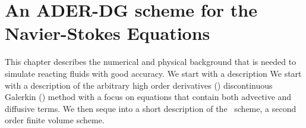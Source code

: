 
\newcommand{\Q}{\bm{Q}}
\newcommand{\gradQ}{\gradient{\Q}}
\newcommand{\Qrho}{\rho}
\newcommand{\Qj}{\rho \bm{v}}
\newcommand{\Qv}{\bm{v}}
\newcommand{\QE}{\rho E}
\newcommand{\QZZ}{Z} %
\newcommand{\QZ}{\rho \QZZ}
\newcommand{\potT}{\theta}
\newcommand{\backgroundPotT}{\overline{\theta}}
\newcommand{\pertubationPotT}{\theta'}
\newcommand{\stressT}{\bm{\sigma}}
\newcommand{\pressure}{p}
\newcommand{\maxConvEigen}[1][]{
  \vert%
  \lambda_c^{\text{max}}
  \notblank{#1}{\left(#1\right)}{}
  \vert%
}
\newcommand{\maxViscEigen}[1][]{
  \vert%
  \lambda_v^{\text{max}}
  \notblank{#1}{\left(#1\right)}{}
  \vert%
}
\newcommand{\Riemann}{\operatorname{Riemann}}

\newcommand{\domain}{\Omega}
\newcommand{\broken}{\domain}
\newcommand{\cell}[1][]{C_{#1}}
\newcommand{\boundary}{\partial \domain}
\newcommand{\normal}{\bm{n}}
\newcommand{\dsol}[1][h]{\bm{u}_{#1}}
\newcommand{\stpredictor}[1][h]{\bm{q}_{#1}}

\newcommand{\flux}{F}
\newcommand{\viscFlux}{\flux^{v}}
\newcommand{\hyperFlux}{\flux^{h}}
\newcommand{\source}[1][]{
  \notblank{#1}{
S_{#1}
}{
\bm{S}
}
}

\newcommand{\intdt}[1]{\int_{t^n}^{t^{n+1}} #1 \dd{t}}
\newcommand{\intdcell}[1]{\int_{\cell} #1 \dd{\bm{x}}}
\newcommand{\intdrefcell}[1]{\int_{\cell} #1 \dd{\hat{\bm{x}}}}
\newcommand{\intdcellb}[1]{\int_{\partial{} \cell} #1 \dd{S}} %
\newcommand{\intdrefcellb}[1]{\int_{\partial{} \cell} #1 \hat{\dd{S}}} %

\newcommand{\quadWeight}[1][i]{w_{#1}}

\chapter{An ADER-DG scheme for the Navier-Stokes Equations}\label{chap:methods}
This chapter describes the numerical and physical background that is needed to simulate reacting fluids with good accuracy.
We start with a description 
We start with a description of the arbitrary high order derivatives (\ader) discontinuous Galerkin (\dg) method with a focus on equations that contain both advective and diffusive terms.
We then seque into a short description of the \muscl\ scheme, a second order finite volume scheme.

